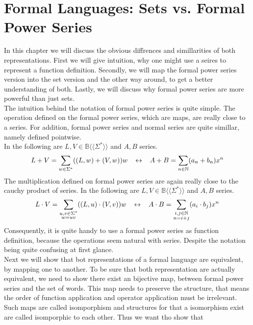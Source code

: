 \documentclass[12pt,letterpaper]{article}
\newcommand{\fps}[1] {
\mathbb{#1}\langle \langle \Sigma^* \rangle \rangle
}
\begin{document}
\section{Formal Languages: Sets vs. Formal Power Series}
In this chapter we will discuss the obvious diffrences and 
simillarities of both representations. First we will give intuition,
why one might use a seires to represent a function definition.
Secondly, we will map the formal power series version into the set
version and the other way around, to get a better understanding of both.
Lastly, we will discuss why formal power series are more powerful
than just sets.\\
The intuition behind the notation of formal power series is quite simple.
The operation defined on the formal power series, which are maps, 
are really close to a series. For addition, formal power series and 
normal series are quite simillar, namely defined pointwise.\\
In the following are $L,V \in \fps{B}$ and $A,B$ series.
\[ 
  L + V = \sum_{w \in \Sigma^*} ((L,w) + (V,w))w \hspace{0.3cm}
  \leftrightarrow \hspace{0.3cm}
  A + B = \sum_{n \in \mathbb{N}} (a_n + b_n) x^n
\]
The multiplication defined on formal power series are again really close
to the cauchy product of series.
In the following are $L,V \in \fps{B}$ and $A,B$ series.
\[
  L \cdot V = \sum_{\substack{u,v \in \Sigma^* \\ w=uv}} 
  ((L,u) \cdot (V,v))w
  \hspace{0.3cm} \leftrightarrow \hspace{0.3cm}
  A \cdot B = 
  \sum_{\substack{i,j \in \mathbb{N} \\ n = i + j}} (a_i \cdot b_j) x^n
\]
Consequently, it is quite handy to use a formal power series as function 
definition, because the operations seem natural with series.
Despite the notation being quite confusing at first glance.\\
Next we will show that bot representations of a formal language are 
equivalent, by mapping one to another.
To be sure that both representation are actually equivalent, we need to
show there exist an bijective map, between formal power series and the
set of words. This map needs to preserve the structure, that means the
order of function application and operator application must be irrelevant.
Such maps are called isomporphism and structures for that a isomorphism 
exist are called isomporphic to each other. Thus we want tho show that
\end{document}

